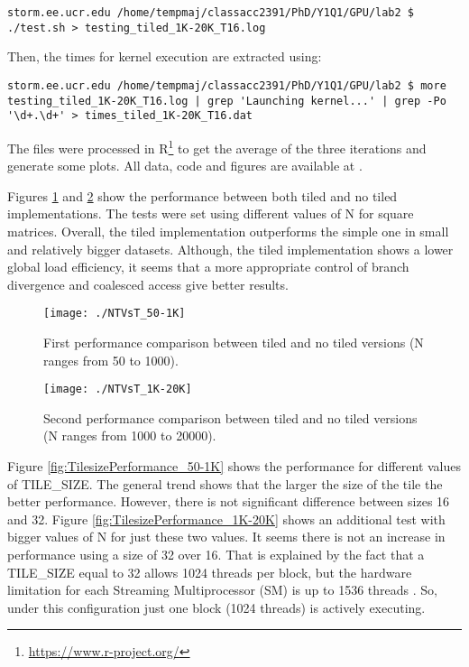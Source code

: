 \documentclass[a4paper,10pt]{scrartcl}
\begin{document}
\begin{enumerate}
\begin{verbatim}
storm.ee.ucr.edu /home/tempmaj/classacc2391/PhD/Y1Q1/GPU/lab2 $ ./test.sh > testing_tiled_1K-20K_T16.log
\end{verbatim}

Then, the times for kernel execution are extracted using:

\begin{verbatim}
storm.ee.ucr.edu /home/tempmaj/classacc2391/PhD/Y1Q1/GPU/lab2 $ more testing_tiled_1K-20K_T16.log | grep 'Launching kernel...' | grep -Po '\d+.\d+' > times_tiled_1K-20K_T16.dat
\end{verbatim}
 
The files were processed in R\footnote{\url{https://www.r-project.org/}} to get the average of the three iterations and generate some plots. All data, code and figures are available at \cite{github}.

Figures \ref{fig:NTVsT_50-1K} and \ref{fig:NTVsT_1K-20K} show the performance between both tiled and no tiled implementations.  The tests were set using different values of N for square matrices. Overall, the tiled implementation outperforms the simple one in small and relatively bigger datasets.  Although, the tiled implementation shows a lower global load efficiency, it seems that a more appropriate control of branch divergence and coalesced access give better results. 

 \begin{figure}
 \centering
 \texttt{[image: ./NTVsT\_50-1K]}
 \caption{First performance comparison between tiled and no tiled versions (N ranges from 50 to 1000).}\label{fig:NTVsT_50-1K}
 \end{figure}

 \begin{figure}
 \centering
 \texttt{[image: ./NTVsT\_1K-20K]}
 \caption{Second performance comparison between tiled and no tiled versions (N ranges from 1000 to 20000).}\label{fig:NTVsT_1K-20K}
 \end{figure}

Figure \ref{fig:TilesizePerformance_50-1K} shows the performance for different values of TILE\_SIZE.  The general trend shows that the larger the size of the tile the better performance.  However, there is not significant difference between sizes 16 and 32.  Figure \ref{fig:TilesizePerformance_1K-20K} shows an additional test with bigger values of N for just these two values.  It seems there is not an increase in performance using a size of 32 over 16.  That is explained by the fact that a TILE\_SIZE equal to 32 allows 1024 threads per block, but the hardware limitation for each Streaming Multiprocessor (SM) is up to 1536 threads \cite{kirk2012}. So, under this configuration just one block (1024 threads) is actively executing.
 

\end{enumerate}
\end{document}
